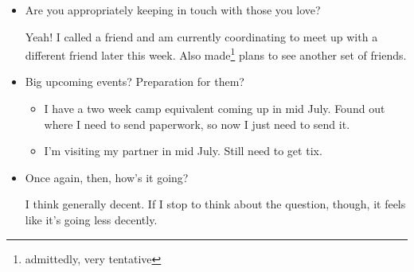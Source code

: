 \documentclass[12pt]{article}
\renewcommand{\,}{\textsuperscript{,}}
\begin{document}
\begin{itemize}
In general I could do better about showing my appreciation to those around me and revising my materials.

\item Are you appropriately keeping in touch with those you love?

Yeah! I called a friend and am currently coordinating to meet up with a different friend later this week.  
Also made\footnote{admittedly, very tentative} plans to see another set of friends.

\item Big upcoming events? Preparation for them?

\begin{itemize}

\item I have a two week camp equivalent coming up in mid July. Found out where I need to send paperwork, so now I just need to send it.  
\item I'm visiting my partner in mid July. Still need to get tix.

\end{itemize}

\item Once again, then, how's it going?

I think generally decent.  
If I stop to think about the question, though, it feels like it's going less decently.

\end{itemize}
\end{document}

